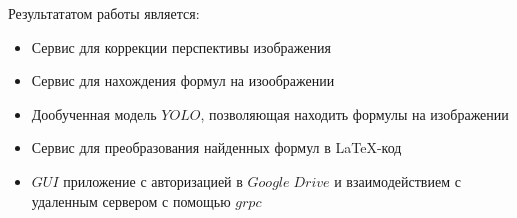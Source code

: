 Результататом работы является:
\begin{itemize}
    \item Сервис для коррекции перспективы изображения
    \item Сервис для нахождения формул на изоображении
    \item Дообученная модель $YOLO$, позволяющая находить формулы на изображении
    \item Сервис для преобразования найденных формул в \LaTeX-код
    \item $GUI$ приложение с авторизацией в $Google\; Drive$ и взаимодействием с удаленным сервером с помощью $grpc$
\end{itemize}